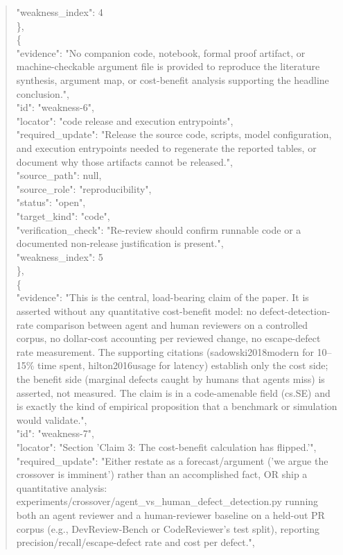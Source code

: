 \documentclass[11pt]{article}
\begin{document}
\begin{quote}
      "weakness\_index": 4\\
    \},\\
    \{\\
      "evidence": "No companion code, notebook, formal proof artifact, or machine-checkable argument file is provided to reproduce the literature synthesis, argument map, or cost-benefit analysis supporting the headline conclusion.",\\
      "id": "weakness-6",\\
      "locator": "code release and execution entrypoints",\\
      "required\_update": "Release the source code, scripts, model configuration, and execution entrypoints needed to regenerate the reported tables, or document why those artifacts cannot be released.",\\
      "source\_path": null,\\
      "source\_role": "reproducibility",\\
      "status": "open",\\
      "target\_kind": "code",\\
      "verification\_check": "Re-review should confirm runnable code or a documented non-release justification is present.",\\
      "weakness\_index": 5\\
    \},\\
    \{\\
      "evidence": "This is the central, load-bearing claim of the paper. It is asserted without any quantitative cost-benefit model: no defect-detection-rate comparison between agent and human reviewers on a controlled corpus, no dollar-cost accounting per reviewed change, no escape-defect rate measurement. The supporting citations (sadowski2018modern for 10--15\% time spent, hilton2016usage for latency) establish only the cost side; the benefit side (marginal defects caught by humans that agents miss) is asserted, not measured. The claim is in a code-amenable field (cs.SE) and is exactly the kind of empirical proposition that a benchmark or simulation would validate.",\\
      "id": "weakness-7",\\
      "locator": "Section 'Claim 3: The cost-benefit calculation has flipped.'",\\
      "required\_update": "Either restate as a forecast/argument ('we argue the crossover is imminent') rather than an accomplished fact, OR ship a quantitative analysis: experiments/crossover/agent\_vs\_human\_defect\_detection.py running both an agent reviewer and a human-reviewer baseline on a held-out PR corpus (e.g., DevReview-Bench or CodeReviewer's test split), reporting precision/recall/escape-defect rate and cost per defect.",\\

\end{quote}
\end{document}
